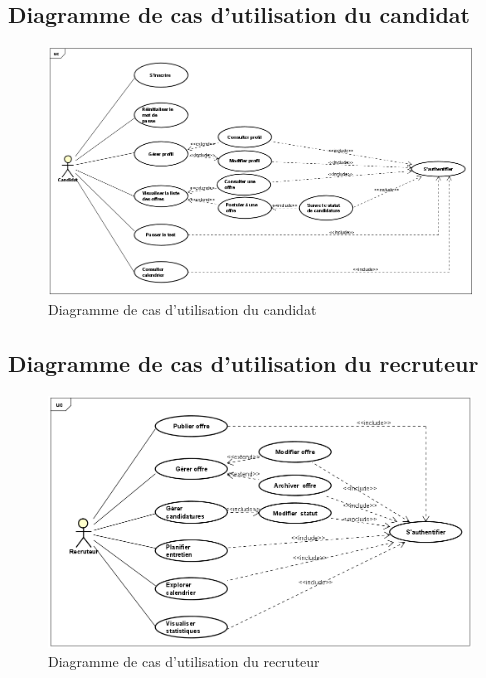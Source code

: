 \subsection{Diagramme de cas d’utilisation du candidat}
\begin{figure}[h]
    \centering
    \includegraphics[scale=0.5]{Images/candidat.png} %
    \caption{Diagramme de cas d’utilisation du candidat}
    \label{fig:UCCandidat}
\end{figure}
\vspace{1cm}

\subsection{Diagramme de cas d’utilisation du recruteur}
\begin{figure}[h]
    \centering
    \includegraphics[scale=0.5]{Images/recruteur.png} %
    \caption{Diagramme de cas d’utilisation du recruteur}
    \label{fig:UCRecruteur}
\end{figure}
\vspace{1cm}

